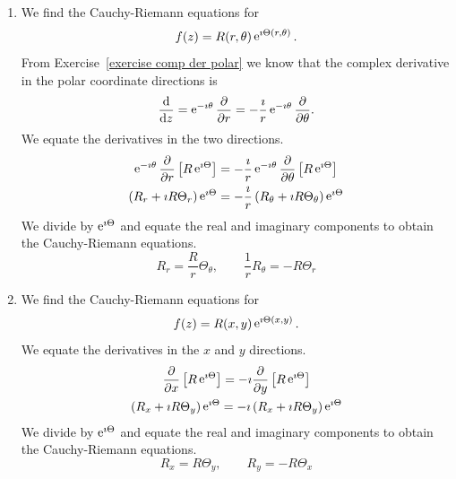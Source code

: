 {%
\begin{Solution}
  \label{solution C-R polar form polar coords}
  \begin{enumerate}
  \item 
    We find the Cauchy-Riemann equations for 
    \[
    f(z) = R(r, \theta) \mathop{\mathrm{e}}\nolimits^{\imath \Theta(r,\theta)}.
    \]
    From Exercise~\ref{exercise comp der polar} we know that the complex 
    derivative in the polar coordinate directions is
    \[
    \frac{\mathrm{d}}{\mathrm{d} z} = \mathop{\mathrm{e}}\nolimits^{-\imath \theta} \frac{\partial}{\partial r} 
    = - \frac{\imath}{r} \mathop{\mathrm{e}}\nolimits^{-\imath \theta} \frac{\partial}{\partial \theta}.
    \]
    We equate the derivatives in the two directions.
    \begin{gather*}
      \mathop{\mathrm{e}}\nolimits^{-\imath \theta} \frac{\partial}{\partial r} \left[ R \mathop{\mathrm{e}}\nolimits^{\imath \Theta} \right] 
      = - \frac{\imath}{r} \mathop{\mathrm{e}}\nolimits^{-\imath \theta} \frac{\partial}{\partial \theta} \left[ R \mathop{\mathrm{e}}\nolimits^{\imath \Theta} \right] 
      \\
      \left( R_r + \imath R \Theta_r \right) \mathop{\mathrm{e}}\nolimits^{\imath \Theta} 
      = - \frac{\imath}{r} \left( R_\theta + \imath R \Theta_\theta \right) \mathop{\mathrm{e}}\nolimits^{\imath \Theta}
    \end{gather*}
    We divide by $\mathop{\mathrm{e}}\nolimits^{\imath \Theta}$ and equate the real and imaginary components
    to obtain the Cauchy-Riemann equations.
    \[
    R_r = \frac{R}{r} \Theta_\theta, \qquad
    \frac{1}{r} R_\theta = - R \Theta_r
    \]
  \item
    We find the Cauchy-Riemann equations for 
    \[
    f(z) = R(x,y) \mathop{\mathrm{e}}\nolimits^{\imath \Theta(x,y)}.
    \]
    We equate the derivatives in the $x$ and $y$ directions.
    \begin{gather*}
      \frac{\partial}{\partial x} \left[ R \mathop{\mathrm{e}}\nolimits^{\imath \Theta} \right] 
      = - \imath  \frac{\partial}{\partial y} \left[ R \mathop{\mathrm{e}}\nolimits^{\imath \Theta} \right] 
      \\
      \left( R_x + \imath R \Theta_y \right) \mathop{\mathrm{e}}\nolimits^{\imath \Theta} 
      = - \imath  \left( R_x + \imath R \Theta_y \right) \mathop{\mathrm{e}}\nolimits^{\imath \Theta}
    \end{gather*}
    We divide by $\mathop{\mathrm{e}}\nolimits^{\imath \Theta}$ and equate the real and imaginary components
    to obtain the Cauchy-Riemann equations.
    \[
    R_x = R \Theta_y, \qquad
    R_y = - R \Theta_x
    \]
  \end{enumerate}
\end{Solution}






}
